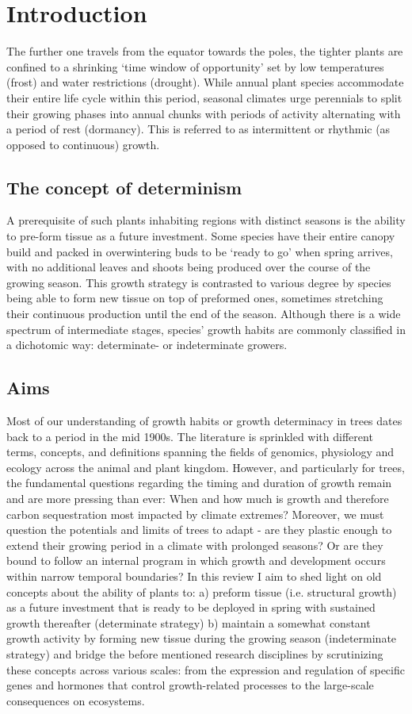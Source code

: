 \documentclass{article}
\begin{document}
\section*{Introduction}
The further one travels from the equator towards the poles, the tighter plants are confined to a shrinking ‘time window of opportunity’ set by low temperatures (frost) and water restrictions (drought). While annual plant species accommodate their entire life cycle within this period, seasonal climates urge perennials to split their growing phases into annual chunks with periods of activity alternating with a period of rest (dormancy). This is referred to as intermittent or rhythmic (as opposed to continuous) growth.

\subsection*{The concept of determinism}
A prerequisite of such plants inhabiting regions with distinct seasons is the ability to pre-form tissue as a future investment. Some species have their entire canopy build and packed in overwintering buds to be ‘ready to go’ when spring arrives, with no additional leaves and shoots being produced over the course of the growing season. This growth strategy is contrasted to various degree by species being able to form new tissue on top of preformed ones, sometimes stretching their continuous production until the end of the season. Although there is a wide spectrum of intermediate stages, species’ growth habits are commonly classified in a dichotomic way: determinate- or indeterminate growers.
\subsection*{Aims}
Most of our understanding of growth habits or growth determinacy in trees dates back to a period in the mid 1900s. The literature is sprinkled with different terms, concepts, and definitions spanning the fields of genomics, physiology and ecology across the animal and plant kingdom. However, and particularly for trees, the fundamental questions regarding the timing and duration of growth remain and are more pressing than ever: When and how much is growth and therefore carbon sequestration most impacted by climate extremes? Moreover, we must question the potentials and limits of trees to adapt - are they plastic enough to extend their growing period in a climate with prolonged seasons? Or are they bound to follow an internal program in which growth and development occurs within narrow temporal boundaries?
In this review I aim to shed light on old concepts about the ability of plants to:
a) preform tissue (i.e. structural growth) as a future investment that is ready to be deployed in spring with sustained growth thereafter (determinate strategy)
b) maintain a somewhat constant growth activity by forming new tissue during the growing season (indeterminate strategy)
and bridge the before mentioned research disciplines by scrutinizing these concepts across various scales: from the expression and regulation of specific genes and hormones that control growth-related processes to the large-scale consequences on ecosystems. 
\\
\end{document}
